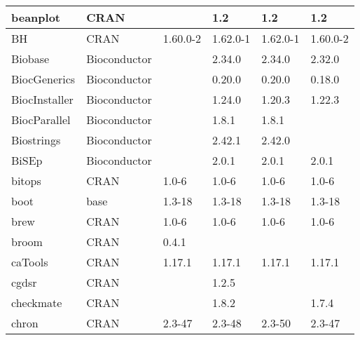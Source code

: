 \begin{longtable}{@{\extracolsep{\fill}}|l|l|l|l|l|l|@{}}
beanplot                      & CRAN                      &             & 1.2         & 1.2            & 1.2              \\ \hline
BH                            & CRAN                      & 1.60.0-2    & 1.62.0-1    & 1.62.0-1       & 1.60.0-2         \\ \hline
Biobase                       & Bioconductor              &             & 2.34.0      & 2.34.0         & 2.32.0           \\ \hline
BiocGenerics                  & Bioconductor              &             & 0.20.0      & 0.20.0         & 0.18.0           \\ \hline
BiocInstaller                 & Bioconductor              &             & 1.24.0      & 1.20.3         & 1.22.3           \\ \hline
BiocParallel                  & Bioconductor              &             & 1.8.1       & 1.8.1          &                  \\ \hline
Biostrings                    & Bioconductor              &             & 2.42.1      & 2.42.0         &                  \\ \hline
BiSEp                         & Bioconductor              &             & 2.0.1       & 2.0.1          & 2.0.1            \\ \hline
bitops                        & CRAN                      & 1.0-6       & 1.0-6       & 1.0-6          & 1.0-6            \\ \hline
boot                          & base                      & 1.3-18      & 1.3-18      & 1.3-18         & 1.3-18           \\ \hline
brew                          & CRAN                      & 1.0-6       & 1.0-6       & 1.0-6          & 1.0-6            \\ \hline
broom                         & CRAN                      & 0.4.1       &             &                &                  \\ \hline
caTools                       & CRAN                      & 1.17.1      & 1.17.1      & 1.17.1         & 1.17.1           \\ \hline
cgdsr                         & CRAN                      &             & 1.2.5       &                &                  \\ \hline
checkmate                     & CRAN                      &             & 1.8.2       &                & 1.7.4            \\ \hline
chron                         & CRAN                      & 2.3-47      & 2.3-48      & 2.3-50         & 2.3-47           \\ \hline

\end{longtable}
